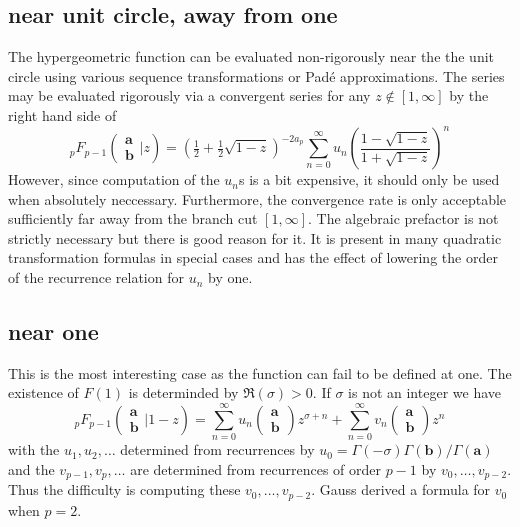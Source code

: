 \documentclass[12pt]{article}
\numberwithin{equation}{section}
\newcommand{\FF}[6] {{}_{#1}{#2}_{#3} \left( \begin{array}{c} #4 \\ #5 \end{array} \Big| {#6}  \right)}
\begin{document}
\subsection{near unit circle, away from one}
The hypergeometric function can be evaluated non-rigorously near the the unit circle using various sequence transformations or Pad\'e approximations. The series may be evaluated rigorously via a convergent series for any $z \not \in [1,\infty]$ by the right hand side of
\begin{equation}
\label{balanced_anywhere}
\FF{p}{F}{p-1}{\mathbf{a}}{\mathbf{b}}{z} = (\tfrac12+ \tfrac12 \sqrt{1-z})^{-2 a_p} \sum_{n=0}^{\infty}u_n \left(\frac{1-\sqrt{1-z}}{1+\sqrt{1-z}}\right)^n
\end{equation}
However, since computation of the $u_n$s is a bit expensive, it should only be used when absolutely neccessary. Furthermore, the convergence rate is only acceptable sufficiently far away from the branch cut $[1,\infty]$. The algebraic prefactor is not strictly necessary but there is good reason for it. It is present in many quadratic transformation formulas in special cases and has the effect of lowering the order of the recurrence relation for $u_n$ by one.

\subsection{near one}

This is the most interesting case as the function can fail to be defined at one. The existence of $F(1)$ is determinded by $\Re(\sigma)> 0$. If $\sigma$ is not an integer we have
\begin{equation}
\label{nearone}
\FF{p}{F}{p-1}{\mathbf{a}}{\mathbf{b}}{1-z} = \sum_{n=0}^{\infty} u_n \left(\begin{array}{c} \mathbf{a}\\\mathbf{b}\end{array} \right) z^{\sigma+n} + \sum_{n=0}^{\infty} v_n \left(\begin{array}{c} \mathbf{a}\\\mathbf{b}\end{array} \right) z^n
\end{equation}
with the $u_1,u_2,\dots$ determined from recurrences by $u_0 = \Gamma(-\sigma)\Gamma(\mathbf{b})/\Gamma(\mathbf{a})$ and the $v_{p-1}, v_p, \dots$ are determined from recurrences of order $p-1$ by $v_0, \dots, v_{p-2}$. Thus the difficulty is computing these $v_0, \dots, v_{p-2}$. Gauss derived a formula for $v_0$ when $p=2$.
\end{document}
